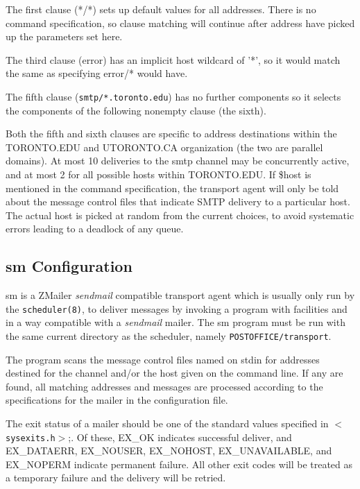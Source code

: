 The  first  clause  (*/*)  sets up default values for all
addresses.  There is no command specification,  so  clause
matching  will  continue  after address have picked up the
parameters set here.

The third clause (error) has an implicit host wildcard  of
'*',  so  it  would  match  the same as specifying error/*
would have.

The fifth clause ({\tt smtp/*.toronto.edu}) has no further  
components so it selects the components of the following nonempty 
clause (the sixth).

Both the fifth and sixth clauses are specific  to  address
destinations  within the TORONTO.EDU and UTORONTO.CA 
organization (the two  are  parallel  domains).   At  most  10
deliveries to the smtp channel may be concurrently active,
and at most 2 for all possible hosts  within  TORONTO.EDU.
If \$host  is  mentioned in the command specification, the
transport agent will only be told about the  message  control  
files that indicate SMTP delivery to a particular
host. The actual host is picked at random from the  current  
choices, to avoid systematic errors leading to a deadlock of any queue.
















\subsection{sm Configuration}



sm  is a ZMailer {\em sendmail\/} compatible transport agent which is usually only run
by the {\tt scheduler(8)}, to deliver messages  by  invoking a
program with  facilities  and  in a way compatible with a
{\em sendmail\/} mailer. The sm program must be run with the same
current directory as the scheduler, namely {\tt POSTOFFICE/transport}.

The program scans the message control files named on stdin
for addresses destined for the channel and/or the host
given on the command line. If any are found, all matching
addresses and messages are processed according to the
specifications for the mailer in the configuration file.

The exit status of a mailer should be one of the standard
values specified in {\tt {\(<\)}sysexits.h{\(>\)}};. Of these, 
EX\_OK indicates  successful  deliver,  and  EX\_DATAERR,   EX\_NOUSER,
EX\_NOHOST,  EX\_UNAVAILABLE,  and EX\_NOPERM indicate permanent failure.  
All other exit codes will be treated  as a
temporary failure and the delivery will be retried.

